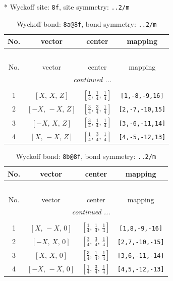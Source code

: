 \documentclass[fleqn,8pt]{jsarticle}
\begin{document}
* Wyckoff site: {\tt 8f}, site symmetry: {\tt ..2/m}
\renewcommand{\arraystretch}{1.2}
\begin{longtable}{cccc}
\caption{Wyckoff bond: {\tt 8a@8f}, bond symmetry: {\tt ..2/m}}
 \\
 \hline \hline
No. & vector & center & mapping \\ \hline \endfirsthead

\multicolumn{3}{l}{\tablename\ \thetable{}} \\
 \hline \hline
No. & vector & center & mapping \\ \hline \endhead

 \hline \hline
\multicolumn{3}{r}{\footnotesize\it continued ...} \\ \endfoot

 \hline \hline
\multicolumn{3}{r}{} \\ \endlastfoot

1 & $\left[ X,\, X,\, Z \right]$ & $\left[ \frac{1}{4},\, \frac{1}{4},\, \frac{1}{4} \right]$ & {\tt [1,-8,-9,16]} \\ \hline
2 & $\left[ - X,\, - X,\, Z \right]$ & $\left[ \frac{3}{4},\, \frac{3}{4},\, \frac{1}{4} \right]$ & {\tt [2,-7,-10,15]} \\ \hline
3 & $\left[ - X,\, X,\, Z \right]$ & $\left[ \frac{3}{4},\, \frac{1}{4},\, \frac{1}{4} \right]$ & {\tt [3,-6,-11,14]} \\ \hline
4 & $\left[ X,\, - X,\, Z \right]$ & $\left[ \frac{1}{4},\, \frac{3}{4},\, \frac{1}{4} \right]$ & {\tt [4,-5,-12,13]} \\
\end{longtable}
\renewcommand{\arraystretch}{1.2}
\begin{longtable}{cccc}
\caption{Wyckoff bond: {\tt 8b@8f}, bond symmetry: {\tt ..2/m}}
 \\
 \hline \hline
No. & vector & center & mapping \\ \hline \endfirsthead

\multicolumn{3}{l}{\tablename\ \thetable{}} \\
 \hline \hline
No. & vector & center & mapping \\ \hline \endhead

 \hline \hline
\multicolumn{3}{r}{\footnotesize\it continued ...} \\ \endfoot

 \hline \hline
\multicolumn{3}{r}{} \\ \endlastfoot

1 & $\left[ X,\, - X,\, 0 \right]$ & $\left[ \frac{1}{4},\, \frac{1}{4},\, \frac{1}{4} \right]$ & {\tt [1,8,-9,-16]} \\ \hline
2 & $\left[ - X,\, X,\, 0 \right]$ & $\left[ \frac{3}{4},\, \frac{3}{4},\, \frac{1}{4} \right]$ & {\tt [2,7,-10,-15]} \\ \hline
3 & $\left[ X,\, X,\, 0 \right]$ & $\left[ \frac{3}{4},\, \frac{1}{4},\, \frac{1}{4} \right]$ & {\tt [3,6,-11,-14]} \\ \hline
4 & $\left[ - X,\, - X,\, 0 \right]$ & $\left[ \frac{1}{4},\, \frac{3}{4},\, \frac{1}{4} \right]$ & {\tt [4,5,-12,-13]} \\
\end{longtable}
\end{document}

